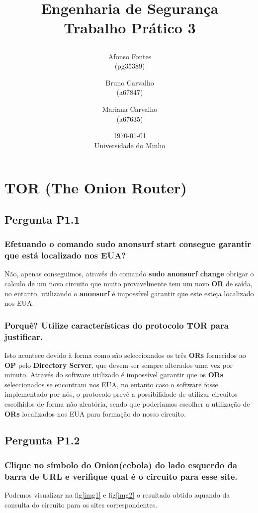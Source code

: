 \documentclass{report}
\title{\Large{\textbf{Engenharia de Segurança}} \\[1cm]
 \LARGE{\textbf{Trabalho Prático 3}}
\author{ Afonso Fontes\\ \small(pg35389) \and Bruno Carvalho\\ \small(a67847) \and Mariana Carvalho\\ \small(a67635)}
\date{\today\\Universidade do Minho}}
\begin{document}
\maketitle

\section*{TOR (The Onion Router)}

\subsection*{Pergunta P1.1}
\subsubsection*{Efetuando o comando \textbf{sudo anonsurf start} consegue garantir que está localizado nos EUA?}
Não, apenas conseguimos, através do comando \textbf{sudo anonsurf change} obrigar o calculo de um novo circuito que muito provavelmente tem um novo \textbf{OR} de saída, no entanto, utilizando o \textbf{anonsurf} é impossível garantir que este esteja localizado nos EUA.
 
\subsubsection*{Porquê? Utilize características do protocolo TOR para justificar.}
Isto acontece devido à forma como são seleccionados os três \textbf{ORs} fornecidos ao \textbf{OP} pelo \textbf{Directory Server}, que devem ser sempre alterados uma vez por minuto. Através do software utilizado é impossível garantir que os \textbf{ORs} seleccionados se encontram nos EUA, no entanto caso o software fosse implementado por nós, o protocolo prevê a possibilidade de utilizar circuitos escolhidos de forma não aleatória, sendo que poderiamos escolher a utilização de \textbf{ORs} localizados nos EUA para formação do nosso circuito.

\subsection*{Pergunta P1.2}
\subsubsection*{Clique no símbolo do Onion(cebola) do lado esquerdo da barra de URL e verifique qual é o circuito para esse site.}
Podemos visualizar na fig\ref{img1} e fig\ref{img2} o resultado obtido aquando da consulta do circuito para os sites correspondentes.
\end{document}
